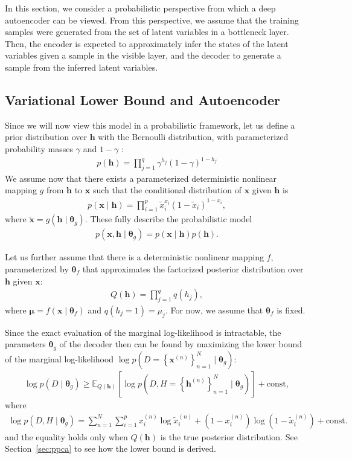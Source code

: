 \documentclass[dissertation,nocontribution,draft*]{aaltoseries}
\newcommand{\vect}[1]{\mathbf{#1}}
\newcommand{\vects}[1]{\boldsymbol{#1}}
\newcommand{\vh}[0]{\vect{h}}
\newcommand{\vx}[0]{\vect{x}}
\newcommand{\vmu}[0]{\vects{\mu}}
\newcommand{\TT}[0]{{\vects{\theta}}}
\newcommand{\E}[0]{\mathbb{E}}
\begin{document}
In this section, we consider a probabilistic perspective from
which a deep autoencoder can be viewed. From this
perspective, we assume that the training samples were
generated from the set of latent variables in a bottleneck
layer. Then, the encoder is expected to approximately infer
the states of the latent variables given a sample in the
visible layer, and the decoder to generate a sample from the
inferred latent variables.

\subsection{Variational Lower Bound and Autoencoder}
\label{sec:autoencoder_vari}

Since we will now view this model in a probabilistic
framework, let us define a prior distribution over $\vh$
with the
Bernoulli distribution, with parameterized probability masses
$\gamma$ and $1-\gamma$ :
\begin{align}
    \label{eq:ae_prior}
    p(\vh) = \prod_{j=1}^q \gamma^{h_j} (1 - \gamma)^{1 -
    h_j}
\end{align}
We assume now that there exists a parameterized
deterministic nonlinear mapping $g$ from $\vh$ to $\vx$ such
that the conditional distribution of $\vx$ given $\vh$ is
\begin{align}
    \label{eq:ae_cond}
    p(\vx \mid \vh) = \prod_{i=1}^p \tilde{x}_i^{x_i} (1 -
    \tilde{x}_i)^{1 - x_i},
\end{align}
where $\tilde{\vx} = g(\vh \mid \TT_g)$. These fully
describe the probabilistic model 
\begin{align}
    \label{eq:ae_full}
p(\vx, \vh \mid \TT_g) = p(\vx \mid \vh) p(\vh).
\end{align}

Let us further assume that there is a deterministic
nonlinear mapping $f$, parameterized by $\TT_f$ that
approximates the factorized posterior distribution over
$\vh$ given $\vx$:
\begin{align}
    \label{eq:ae_posterior}
    Q(\vh) = \prod_{j=1}^q q(h_j),
\end{align}
where $\vmu = f(\vx \mid \TT_f)$ and $q(h_j = 1) = \mu_j$.
For now, we assume that $\TT_f$ is fixed.

Since the exact evaluation of the marginal log-likelihood is
intractable, the parameters $\TT_g$ of the decoder then
can be found by maximizing the lower bound of the marginal
log-likelihood $\log p(D = \left\{ \vx^{(n)}
\right\}_{n=1}^N \mid \TT_g)$:
\begin{align*}
    \log p(D \mid \TT_g) \geq \E_{Q(\vh)} \left[ \log p\left(D,
    H=\left\{ \vh^{(n)} \right\}_{n=1}^N \mid \TT_g\right) \right] +
    \text{const},
\end{align*}
where 
\begin{align*}
    \log p(D, H \mid \TT_g) = \sum_{n=1}^N \sum_{i=1}^p
    x^{(n)}_i \log
    \tilde{x}^{(n)}_i + (1 - x^{(n)}_i) \log (1 -
    \tilde{x}^{(n)}_i) + \text{const}.
\end{align*}
and the equality holds only when $Q(\vh)$ is the true
posterior distribution. See Section~\ref{sec:ppca} to see
how the lower bound is derived.
\end{document}

